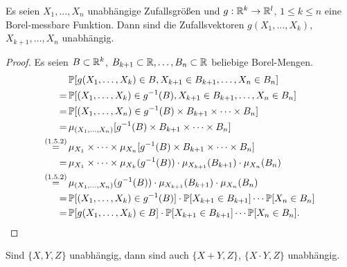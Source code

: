 \begin{thm}
  Es seien $X_1, \ldots, X_n$ unabhängige Zufallsgrößen und $g: \mathbb{R}^k \to
  \mathbb{R}^l$, $1 \le k \le n$ eine Borel-messbare Funktion. Dann sind die
  Zufallsvektoren $g(X_1, \ldots, X_k)$, $X_{k+1}, \ldots, X_n$ unabhängig.
\end{thm}

\begin{proof}
  Es seien $B \subset \mathbb{R}^k$, $B_{k+1} \subset \mathbb{R}, \ldots, B_n \subset
  \mathbb{R}$ beliebige Borel-Mengen.
  \begin{align*}
    &\mathbb{P} [ g(X_1, \ldots, X_k) \in B, X_{k+1} \in B_{k+1}, \ldots, X_n \in B_n ] \\
    =\, &\mathbb{P} [ (X_1, \ldots, X_k) \in g^{-1}(B), X_{k+1} \in B_{k+1}, \ldots, X_n \in B_n ] \\
    =\, &\mathbb{P} [ (X_1, \ldots, X_n) \in g^{-1}(B) \times B_{k+1} \times \cdots \times B_n ] \\
    =\, &\mu_{(X_1, \ldots, X_n)} [ g^{-1}(B) \times B_{k+1} \times \cdots \times B_n ] \\
    \overset{(1.5.2)}{=}\, &\mu_{X_1} \times \cdots \times \mu_{X_n} [ g^{-1}(B) \times B_{k+1} \times \cdots \times B_n ] \\
    =\, &\mu_{X_1} \times \cdots \times \mu_{X_k} (g^{-1}(B)) \cdot \mu_{X_{k+1}}(B_{k+1}) \cdot \mu_{X_n}(B_n) \\
    \overset{(1.5.2)}{=}\, &\mu_{(X_1, \ldots, X_n)} (g^{-1}(B)) \cdot \mu_{X_{k+1}}(B_{k+1}) \cdot \mu_{X_n}(B_n) \\
    =\, &\mathbb{P} [ (X_1, \ldots, X_k) \in g^{-1}(B)] \cdot \mathbb{P}[X_{k+1} \in B_{k+1}] \cdots \mathbb{P}[X_n \in B_n] \\
    =\, &\mathbb{P} [ g(X_1, \ldots, X_k) \in B] \cdot \mathbb{P}[X_{k+1} \in B_{k+1}] \cdots \mathbb{P}[X_n \in B_n]. \qedhere
  \end{align*}
\end{proof}

\begin{folg}
  Sind $\{ X, Y, Z \}$ unabhängig, dann sind auch $\{ X+Y, Z\}$, $\{X \cdot Y, Z
  \}$ unabhängig.
\end{folg}

